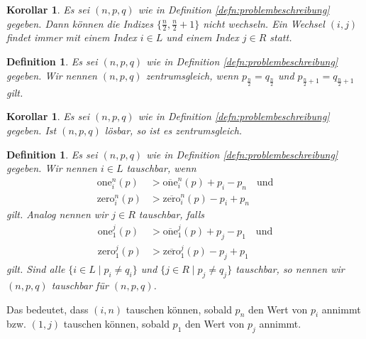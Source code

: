 \documentclass[12pt]{article}
\newtheorem{defn}[thm]{Definition}
\newtheorem{cor}[thm]{Korollar}
\begin{document}
\begin{cor}
Es sei $(n, p, q)$ wie in Definition \ref{defn:problembeschreibung} gegeben. Dann können die Indizes $\{\frac{n}{2}, \frac{n}{2}+1 \}$ nicht wechseln. Ein Wechsel $(i, j)$ findet immer mit einem Index $i\in L$ und einem Index $j\in R$ statt.
\label{cor:Wechsel nur aus L und R}
\end{cor}

\begin{defn}
Es sei $(n, p, q)$ wie in Definition \ref{defn:problembeschreibung} gegeben. Wir nennen $(n, p, q)$ \emph{zentrumsgleich}, wenn $p_{\frac{n}{2}}=q_{\frac{n}{2}}$ und $p_{\frac{n}{2}+1}=q_{\frac{n}{2}+1}$ gilt.
\label{defn:zentrumsgleich}
\end{defn}

\begin{cor}
Es sei $(n, p, q)$ wie in Definition \ref{defn:problembeschreibung} gegeben. Ist $(n, p, q)$ lösbar, so ist es zentrumsgleich.
\label{cor:zentrum invariant}
\end{cor}

\begin{defn}
Es sei $(n, p, q)$ wie in Definition \ref{defn:problembeschreibung} gegeben. Wir nennen $i\in L$ tauschbar, wenn 
\begin{align}
\mathrm{one}_i^{n}(p)
&> 
\overline{\mathrm{one}}_i^{n}(p)
+
p_i-p_n
\quad\textrm{und}
\label{eq:Bedingung i und n tauschbar -> ones greater}
\\
\mathrm{zero}_i^{n}(p)
&> 
\overline{\mathrm{zero}}_i^{n}(p)
-
p_i+p_n
\label{eq:Bedingung i und n tauschbar -> zeros greater}
\end{align}
gilt. Analog nennen wir $j\in R$ tauschbar, falls
\begin{align}
\mathrm{one}_1^{j}(p)
&> 
\overline{\mathrm{one}}_1^{j}(p)
+
p_j-p_1
\quad\textrm{und}
\label{eq:Bedingung 1 und j tauschbar -> ones greater}
\\
\mathrm{zero}_1^{j}(p)
&> 
\overline{\mathrm{zero}}_1^{j}(p)
-
p_j+p_1
\label{eq:Bedingung 1 und j tauschbar -> zeroes greater}
\end{align}
gilt.
Sind alle $\{i\in L \mid p_i\neq q_i\}$ und $\{j\in R \mid p_j\neq q_j\}$ tauschbar, so nennen wir $(n, p, q)$ tauschbar für $(n, p, q)$.
\end{defn}
\noindent Das bedeutet, dass $(i, n)$ tauschen können, sobald $p_n$ den Wert von $p_i$ annimmt bzw. $(1, j)$ tauschen können, sobald $p_1$ den Wert von $p_j$ annimmt. 
\end{document}
